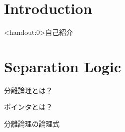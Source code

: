 \documentclass[notheorems, aspectratio=169, 12pt, unicode]{beamer}
\begin{document}
\begin{frame}
 \titlepage
\end{frame}

\section{Introduction}

\begin{frame}<handout:0>{自己紹介}
 
\end{frame}

\section{Separation Logic}

\begin{frame}{分離論理とは？}
 
\end{frame}

\begin{frame}{ポインタとは？}
 
\end{frame}

\begin{frame}{分離論理の論理式}
 
\end{frame}
\end{document}
